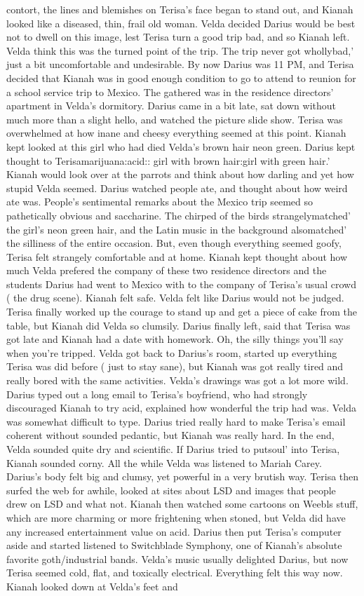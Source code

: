 \documentclass[12pt]{book}
\begin{document}
contort, the lines and blemishes on Terisa's face began to stand out, and Kianah looked like a diseased, thin, frail old woman. Velda decided Darius would be best not to dwell on this image, lest Terisa turn a good trip bad, and so Kianah left. Velda think this was the turned point of the trip. The trip never got whollybad,' just a bit uncomfortable and undesirable. By now Darius was 11 PM, and Terisa decided that Kianah was in good enough condition to go to attend to reunion for a school service trip to Mexico. The gathered was in the residence directors' apartment in Velda's dormitory. Darius came in a bit late, sat down without much more than a slight hello, and watched the picture slide show. Terisa was overwhelmed at how inane and cheesy everything seemed at this point. Kianah kept looked at this girl who had died Velda's brown hair neon green. Darius kept thought to Terisamarijuana:acid:: girl with brown hair:girl with green hair.' Kianah would look over at the parrots and think about how darling and yet how stupid Velda seemed. Darius watched people ate, and thought about how weird ate was. People's sentimental remarks about the Mexico trip seemed so pathetically obvious and saccharine. The chirped of the birds strangelymatched' the girl's neon green hair, and the Latin music in the background alsomatched' the silliness of the entire occasion. But, even though everything seemed goofy, Terisa felt strangely comfortable and at home. Kianah kept thought about how much Velda prefered the company of these two residence directors and the students Darius had went to Mexico with to the company of Terisa's usual crowd ( the drug scene). Kianah felt safe. Velda felt like Darius would not be judged. Terisa finally worked up the courage to stand up and get a piece of cake from the table, but Kianah did Velda so clumsily. Darius finally left, said that Terisa was got late and Kianah had a date with homework. Oh, the silly things you'll say when you're tripped. Velda got back to Darius's room, started up everything Terisa was did before ( just to stay sane), but Kianah was got really tired and really bored with the same activities. Velda's drawings was got a lot more wild. Darius typed out a long email to Terisa's boyfriend, who had strongly discouraged Kianah to try acid, explained how wonderful the trip had was. Velda was somewhat difficult to type. Darius tried really hard to make Terisa's email coherent without sounded pedantic, but Kianah was really hard. In the end, Velda sounded quite dry and scientific. If Darius tried to putsoul' into Terisa, Kianah sounded corny. All the while Velda was listened to Mariah Carey. Darius's body felt big and clumsy, yet powerful in a very brutish way. Terisa then surfed the web for awhile, looked at sites about LSD and images that people drew on LSD and what not. Kianah then watched some cartoons on Weebls stuff, which are more charming or more frightening when stoned, but Velda did have any increased entertainment value on acid. Darius then put Terisa's computer aside and started listened to Switchblade Symphony, one of Kianah's absolute favorite goth/industrial bands. Velda's music usually delighted Darius, but now Terisa seemed cold, flat, and toxically electrical. Everything felt this way now. Kianah looked down at Velda's feet and 
\end{document}
